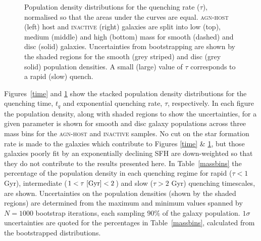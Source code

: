 \begin{figure}
\caption[Quenching rate population density distributions for the \textsc{agn-host} and \textsc{inactive} samples]{Population density distributions for the quenching rate ($\tau$), normalised so that the areas under the curves are equal. \textsc{agn-host} (left) host and \textsc{inactive} (right) galaxies are split into low (top), medium (middle) and high (bottom) mass for smooth (dashed) and disc (solid) galaxies. Uncertainties from bootstrapping are shown by the shaded regions for the smooth (grey striped) and disc (grey solid) population densities. A small (large) value of $\tau$ corresponds to a rapid (slow) quench.}
\label{rate}
\end{figure}

Figures~\ref{time} and \ref{rate} show the stacked population density distributions for the quenching time, $t_q$ and exponential quenching rate, $\tau$, respectively. In each figure the population density, along with shaded regions to show the uncertainties, for a given parameter is shown for smooth and disc galaxy populations across three mass bins for the \textsc{agn-host} and \textsc{inactive} samples. No cut on the star formation rate is made to the galaxies which contribute to Figures \ref{time} \& \ref{rate}, but those galaxies poorly fit by an exponentially declining SFH are down-weighted so that they do not contribute to the results presented here. In Table~\ref{massbins} the percentage of the  population density in each quenching regime for rapid ($\tau < 1$ Gyr), intermediate ($1 < \tau ~\rm{[Gyr]} < 2$) and slow ($\tau > 2$ Gyr) quenching timescales, are shown. Uncertainties on the population densities (shown by the shaded regions) are determined from the maximum and minimum values spanned by $N = 1000$ bootstrap iterations, each sampling $90\%$ of the galaxy population. $1\sigma$ uncertainties are quoted for the percentages in Table~\ref{massbins}, calculated from the bootstrapped distributions.


